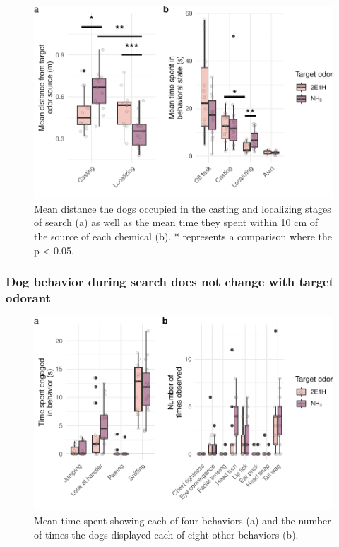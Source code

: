 \documentclass[
]{article}
\begin{document}
\begin{figure}
\centering
\includegraphics{main-manuscript_files/figure-latex/hole-times-1.pdf}
\caption{\label{fig:hole-times}Mean distance the dogs occupied in the casting and localizing stages of search (a) as well as the mean time they spent within 10 cm of the source of each chemical (b). * represents a comparison where the p \textless{} 0.05.}
\end{figure}

\hypertarget{dog-behavior-during-search-does-not-change-with-target-odorant}{%
\subsubsection{Dog behavior during search does not change with target odorant}\label{dog-behavior-during-search-does-not-change-with-target-odorant}}

\begin{figure}
\centering
\includegraphics{main-manuscript_files/figure-latex/indiv-behavior-times-1.pdf}
\caption{\label{fig:indiv-behavior-times}Mean time spent showing each of four behaviors (a) and the number of times the dogs displayed each of eight other behaviors (b).}
\end{figure}
\end{document}
